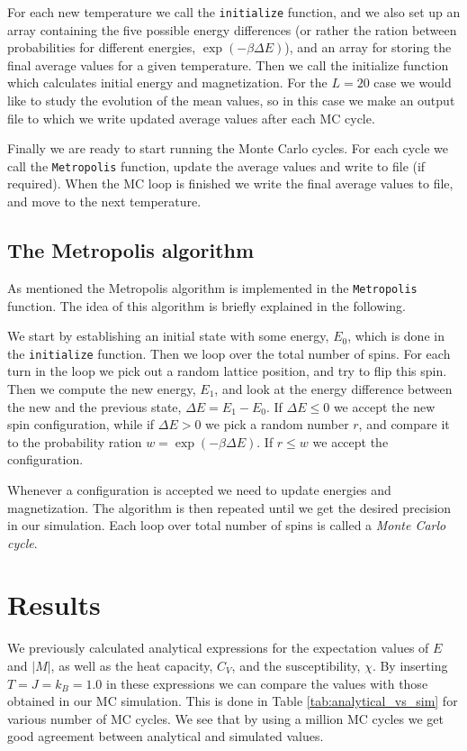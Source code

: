 \documentclass[12pt, a4paper]{article}
\begin{document}
For each new temperature we call the \texttt{initialize} function, and we also set up an array 
containing the five possible energy differences (or rather the 
ration between probabilities for different energies, $\exp(-\beta\Delta E)$), and an array for 
storing the final average values for a given temperature. Then we call the initialize function which 
calculates initial energy and magnetization. 
For the $L = 20$ case we would like to study the evolution of the mean values, so in this case we make 
an output file to which we write updated average values after each MC cycle.

Finally we are ready to start running the Monte Carlo cycles. For each cycle we call the  
\texttt{Metropolis} function, update the average values and write to file (if required). When the 
MC loop is finished we write the final average values to file, and move to the next temperature.  
  
\subsection{The Metropolis algorithm}

As mentioned the Metropolis algorithm \cite{Metropolis} is implemented in the \texttt{Metropolis} 
function. The idea of this algorithm is briefly explained in the following. 

We start by establishing an initial state with some energy, $E_0$, which is done in the 
\texttt{initialize} function. Then we loop over the total number of spins. For each turn in the loop 
we pick out a random lattice position, and try to flip this spin. Then we compute the new energy, $E_1$, 
and look at the energy difference between the new and the previous state, $\Delta E = E_1 - E_0$. 
If $\Delta E\leq 0$ we accept the new spin configuration, while if $\Delta E > 0$ we pick a random 
number $r$, and compare it to the probability ration $w=\exp(-\beta\Delta E)$. If $r\leq w$ we 
accept the configuration. 

Whenever a configuration is accepted we need to update energies and magnetization. The algorithm is 
then repeated until we get the desired precision in our simulation. Each loop over total number of spins 
is called a \textit{Monte Carlo cycle}.     

\section{Results}

We previously calculated analytical expressions for the expectation values of $E$ and $|M|$, as well as 
the heat capacity, $C_V$, and the susceptibility, $\chi$. By inserting $T = J = k_B = 1.0$ in these 
expressions we can compare the values with those obtained in our MC simulation. This is done in 
Table \ref{tab:analytical_vs_sim} for various number of MC cycles. We see that by using a million 
MC cycles we get good agreement between analytical and simulated values. 
\end{document}

